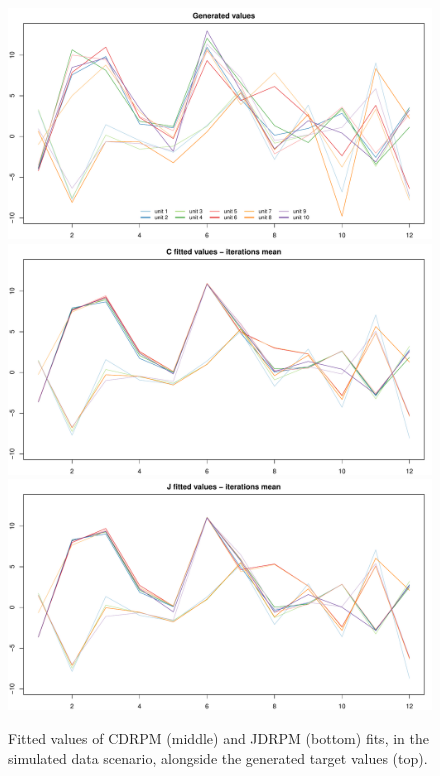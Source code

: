 \documentclass[12pt,	%
	a4paper,		%
	twoside,		%
	openright,		%
	titlepage,%
	]{book}
\theoremstyle{definition}
\begin{document}
\begin{figure}[!p]
    \centering
    \includegraphics[width=0.97\linewidth]{Testing//Assessing correctness//no space/test_1_generated_data.pdf}
    \includegraphics[width=0.97\linewidth]{Testing//Assessing correctness//no space/C_mean_prediction.pdf}
    \includegraphics[width=0.97\linewidth]{Testing//Assessing correctness//no space/J_mean_prediction.pdf}
    \caption[Fitted values of CDRPM and JDRPM, simulated data scenario]{Fitted values of CDRPM (middle) and JDRPM (bottom) fits, in the simulated data scenario, alongside the generated target values (top).}
    \label{fig: fitted and target values no space}
\end{figure}
\end{document}
